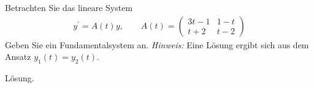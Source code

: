 \begin{exercise}
Betrachten Sie das lineare System
\begin{align*}
  y^{\prime} = A(t)y, \qquad A(t) = \left(\begin{array}{rr}
    3t - 1 & 1 - t \\
    t + 2 & t - 2
  \end{array}\right)
\end{align*}
Geben Sie ein Fundamentalsystem an. \textit{Hinweis:} Eine Lösung ergibt sich
aus dem Ansatz $y_1(t) = y_2(t)$.
\end{exercise}
\begin{solution}
Lösung.
\end{solution}
